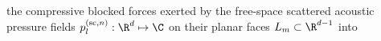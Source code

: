 the compressive blocked forces exerted by
the free-space scattered acoustic pressure fields
$p_{l}^{(\text{sc}, n)}: \R^{d} \mapsto \C$ on
their planar faces
$L_{m} \subset \R^{d-1}$ into
